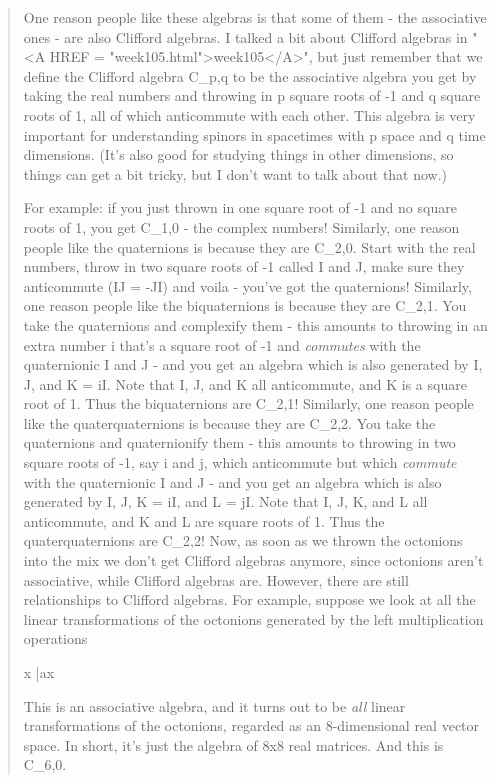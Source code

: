 \begin{quote}
One reason people like these algebras 
is that some of them - the associative ones - are also Clifford algebras.  
I talked a bit about Clifford algebras in 
"<A HREF = "week105.html">week105</A>", but just remember that
we define the 
Clifford algebra C_{p,q} to be the associative algebra you get 
by taking the real numbers and throwing in p square roots of -1 
and q square roots of 1, all of which anticommute with each other.  
This algebra is very important for understanding spinors in spacetimes 
with p space and q time dimensions.   (It's also good for studying 
things in other dimensions, so things can get a bit tricky, but I 
don't want to talk about that now.) 

For example: if you just thrown in one square root of -1 and no 
square roots of 1, you get C_{1,0} - the complex numbers!
Similarly, one reason people like the quaternions is because
they are C_{2,0}.  Start with the real numbers, throw in two
square roots of -1 called I and J, make sure they anticommute 
(IJ = -JI) and voila - you've got the quaternions!   
Similarly, one reason people like the biquaternions is because
they are C_{2,1}.  You take the quaternions and complexify 
them - this amounts to throwing in an extra number i that's a square 
root of -1 and \emph{commutes} with the quaternionic I and J - and you get
an algebra which is also generated by I, J, and K = iI.  Note
that I, J, and K all anticommute, and K is a square root of 1.  
Thus the biquaternions are C_{2,1}!   
Similarly, one reason people like the quaterquaternions is because
they are C_{2,2}.  You take the quaternions and quaternionify
them - this amounts to throwing in two square roots of -1, say i
and j, which anticommute but which \emph{commute} with the quaternionic
I and J - and you get an algebra which is also generated by I, J,
K = iI, and L = jI.  Note that I, J, K, and L all anticommute, and
K and L are square roots of 1.  Thus the quaterquaternions are 
C_{2,2}!
Now, as soon as we thrown the octonions into the mix we don't
get Clifford algebras anymore, since octonions aren't associative,
while Clifford algebras are.  However, there are still relationships
to Clifford algebras.  For example, suppose we look at all the linear
transformations of the octonions generated by the left multiplication
operations

x |\to  ax

This is an associative algebra, and it turns out to be \emph{all}
linear transformations of the octonions, regarded as an 8-dimensional
real vector space.  In short, it's just the algebra of 8x8 real
matrices.  And this is C_{6,0}.  


\end{quote}
